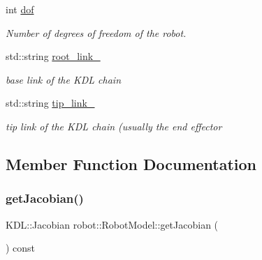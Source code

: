 \begin{DoxyCompactItemize}
int \hyperlink{classrobot_1_1_robot_model_a12e2c01b76bd26b300bd51fc70e69c10}{dof}
\begin{DoxyCompactList}\small\item\em Number of degrees of freedom of the robot. \end{DoxyCompactList}\item 
\mbox{\label{classrobot_1_1_robot_model_a205f62024eda32b3b93b0bbf38b225d7}} 
std\+::string \hyperlink{classrobot_1_1_robot_model_a205f62024eda32b3b93b0bbf38b225d7}{root\+\_\+link\+\_\+}
\begin{DoxyCompactList}\small\item\em base link of the K\+DL chain \end{DoxyCompactList}\item 
\mbox{\label{classrobot_1_1_robot_model_a5273b856f1f91d07e693862ac42735bc}} 
std\+::string \hyperlink{classrobot_1_1_robot_model_a5273b856f1f91d07e693862ac42735bc}{tip\+\_\+link\+\_\+}
\begin{DoxyCompactList}\small\item\em tip link of the K\+DL chain (usually the end effector \end{DoxyCompactList}\end{DoxyCompactItemize}


\subsection{Member Function Documentation}
\mbox{\label{classrobot_1_1_robot_model_a576f026cf5bdde060c7f9e5462d09d79}} 
\subsubsection{\texorpdfstring{get\+Jacobian()}{getJacobian()}}
{\footnotesize\ttfamily K\+D\+L\+::\+Jacobian robot\+::\+Robot\+Model\+::get\+Jacobian (\begin{DoxyParamCaption}{ }\end{DoxyParamCaption}) const\hspace{0.3cm}{\ttfamily [inline]}}



